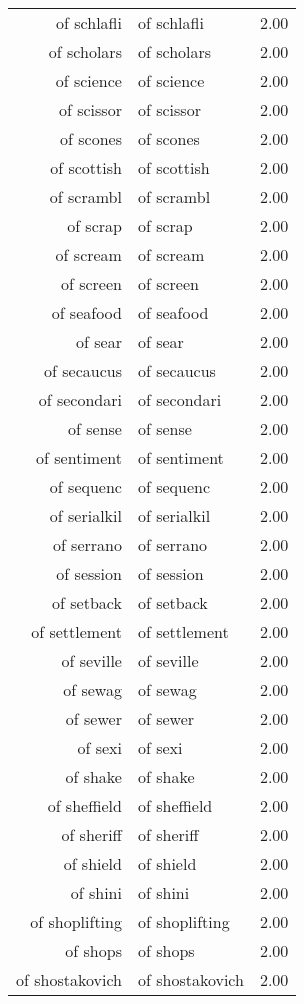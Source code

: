 \begin{table}[ht]
\begin{tabular}{rlr}
  of schlafli & of schlafli & 2.00 \\ 
  of scholars & of scholars & 2.00 \\ 
  of science & of science & 2.00 \\ 
  of scissor & of scissor & 2.00 \\ 
  of scones & of scones & 2.00 \\ 
  of scottish & of scottish & 2.00 \\ 
  of scrambl & of scrambl & 2.00 \\ 
  of scrap & of scrap & 2.00 \\ 
  of scream & of scream & 2.00 \\ 
  of screen & of screen & 2.00 \\ 
  of seafood & of seafood & 2.00 \\ 
  of sear & of sear & 2.00 \\ 
  of secaucus & of secaucus & 2.00 \\ 
  of secondari & of secondari & 2.00 \\ 
  of sense & of sense & 2.00 \\ 
  of sentiment & of sentiment & 2.00 \\ 
  of sequenc & of sequenc & 2.00 \\ 
  of serialkil & of serialkil & 2.00 \\ 
  of serrano & of serrano & 2.00 \\ 
  of session & of session & 2.00 \\ 
  of setback & of setback & 2.00 \\ 
  of settlement & of settlement & 2.00 \\ 
  of seville & of seville & 2.00 \\ 
  of sewag & of sewag & 2.00 \\ 
  of sewer & of sewer & 2.00 \\ 
  of sexi & of sexi & 2.00 \\ 
  of shake & of shake & 2.00 \\ 
  of sheffield & of sheffield & 2.00 \\ 
  of sheriff & of sheriff & 2.00 \\ 
  of shield & of shield & 2.00 \\ 
  of shini & of shini & 2.00 \\ 
  of shoplifting & of shoplifting & 2.00 \\ 
  of shops & of shops & 2.00 \\ 
  of shostakovich & of shostakovich & 2.00 \\ 

\end{tabular}
\end{table}
